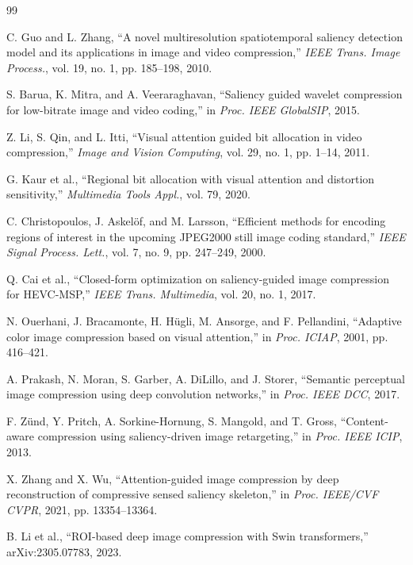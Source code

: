 \documentclass[conference]{IEEEtran}
\begin{document}
\begin{thebibliography}{99}

C. Guo and L. Zhang, ``A novel multiresolution spatiotemporal saliency detection model and its applications in image and video compression,'' \textit{IEEE Trans. Image Process.}, vol. 19, no. 1, pp. 185--198, 2010.

S. Barua, K. Mitra, and A. Veeraraghavan, ``Saliency guided wavelet compression for low-bitrate image and video coding,'' in \textit{Proc. IEEE GlobalSIP}, 2015.

Z. Li, S. Qin, and L. Itti, ``Visual attention guided bit allocation in video compression,'' \textit{Image and Vision Computing}, vol. 29, no. 1, pp. 1--14, 2011.

G. Kaur et al., ``Regional bit allocation with visual attention and distortion sensitivity,'' \textit{Multimedia Tools Appl.}, vol. 79, 2020.

C. Christopoulos, J. Askel\"of, and M. Larsson, ``Efficient methods for encoding regions of interest in the upcoming JPEG2000 still image coding standard,'' \textit{IEEE Signal Process. Lett.}, vol. 7, no. 9, pp. 247--249, 2000.

Q. Cai et al., ``Closed-form optimization on saliency-guided image compression for HEVC-MSP,'' \textit{IEEE Trans. Multimedia}, vol. 20, no. 1, 2017.

N. Ouerhani, J. Bracamonte, H. H\"ugli, M. Ansorge, and F. Pellandini, ``Adaptive color image compression based on visual attention,'' in \textit{Proc. ICIAP}, 2001, pp. 416--421.

A. Prakash, N. Moran, S. Garber, A. DiLillo, and J. Storer, ``Semantic perceptual image compression using deep convolution networks,'' in \textit{Proc. IEEE DCC}, 2017.

F. Z\"und, Y. Pritch, A. Sorkine-Hornung, S. Mangold, and T. Gross, ``Content-aware compression using saliency-driven image retargeting,'' in \textit{Proc. IEEE ICIP}, 2013.

X. Zhang and X. Wu, ``Attention-guided image compression by deep reconstruction of compressive sensed saliency skeleton,'' in \textit{Proc. IEEE/CVF CVPR}, 2021, pp. 13354--13364.

B. Li et al., ``ROI-based deep image compression with Swin transformers,'' arXiv:2305.07783, 2023.


\end{thebibliography}
\end{document}
